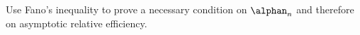 \documentclass[letterpaper, conference]{IEEEtran}      %
\begin{document}
{\color{red}
Use Fano's inequality to prove a necessary condition on $\alphan_n$ and therefore on asymptotic relative efficiency.
}

 



\end{document}
